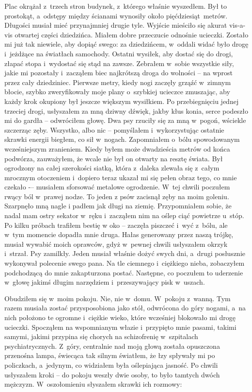 Plac okrążał z~trzech stron budynek, z~którego właśnie wyszedłem. Był to prostokąt, a~odstępy między ścianami wynosiły około pięćdziesiąt~metrów. Długości musiał mieć przynajmniej drugie tyle. Wyjście mieściło się akurat vis-a-vis otwartej części dziedzińca. Miałem dobre przeczucie odnośnie ucieczki. Zostało mi już tak niewiele, aby dopiąć swego: za dziedzińcem, w~oddali widać było drogę i~jeżdżące na światłach samochody. Ostatni wysiłek, aby dostać się do drogi, złapać stopa i~wydostać się stąd na zawsze. Zebrałem w~sobie wszystkie siły, jakie mi pozostały i~zacząłem biec najkrótszą droga do wolności -- na wprost przez cały dziedziniec. Pierwsze metry, kiedy nogi zaczęły grząźć w~zimnym błocie, szybko zweryfikowały moje plany o~szybkiej ucieczce zmuszając, aby każdy krok okupiony był jeszcze większym wysiłkiem. Po przebiegnięciu jednej trzeciej drogi, usłyszałem za mną dziwny dźwięk, jakby kłus konia, serce podeszło mi do gardła -- odwróciłem głowę. Dwa psy rzuciły się za mną w~pogoń, wściekle szczerząc zęby. Wszystko, albo nic -- pomyślałem i~wykorzystując ostatnie skrawki energii biegłem, co sił w~nogach. Zapomniałem o~bólu spowodowanym wcześniejszym zranieniem. Kiedy byłem może dwadzieścia metrów od końca podwórza, zauważyłem, że wcale nie był on otwarty na resztę świata. Był ogrodzony na całej szerokości siatką, która z~daleka zlewała się z~całym mrocznym otoczeniem i~dopiero teraz ukazał mi się pełen obraz tego, co mnie czekało -– musiałem sforsować metalowe ogrodzenie. W~tej chwili poczułem rwący ból w~prawej nodze. To jeden z psów zacisnął zęby na moim goleniu. Szarpnęło mną nagle i padłem jak długi na ziemię. Przypomniałem sobie, że nadal mam ostry sekator w~ręku i~zacząłem nim na oślep ciąć powietrze u~stóp. Po kilku próbach trafiłem bestię w oko -- zaczęła piszczeć i~wyć z~bólu, ale w~tym momencie dopadła mnie druga. Hałas generowany przez naszą trójkę, musiał wywabić moich oprawców, gdyż w~pewnej chwili usłyszałem okrzyk i~strzał. Psy zamilkły. Jeden musiał właśnie dożyć swych dni, a~drugi posłusznie wykonywał polecenie swego pana. Na tle ciemnego i~ciężkiego nieba, zobaczyłem podchodzącą do mnie zakapturzona postać. Następne, co poczułem to uderzenie w~głowę jakimś długim narzędziem i~przeszywający pisk w~uszach.

Obudziłem się w~moim pokoju. Nie, nie w~domu. W~pokoju z~wanną. Tym razem musiała zostać przysposobiona jako stół, odwrócona do góry nogami, a~na nich położono te ogromne i~ciężkie wieko, które wcześniej blokowało mi drogę ucieczki. Spocząłem na wspomnianym włazie i~przypięto mnie pasami, takimi samymi, jakimi przypina się chorych na schizofrenię w~szpitalach psychiatrycznych. Z~góry, centralnie nad moją głową została opuszczona przenośna lampa, świecąca tak silnym światłem, że łzy spływały mi po policzkach, a~jedynym, co widziałem była oślepiająca jasność. Po chwili usłyszałem kroki -- do pokoju weszły dwie osoby, to było tamtych dwóch mężczyzn. W~oszołomieniu słyszałem skrawki ich rozmowy: 

